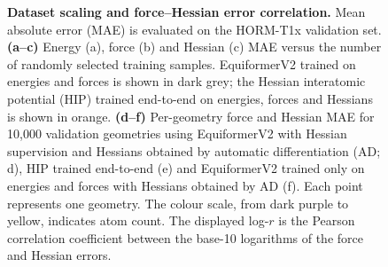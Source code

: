 \documentclass[pdflatex,sn-mathphys-num]{sn-jnl}%
\begin{document}
\begin{figure}[htbp]
     \caption{
     \textbf{Dataset scaling and force--Hessian error correlation.}
     Mean absolute error (MAE) is evaluated on the HORM-T1x validation set.
     \textbf{(a--c)} Energy (a), force (b) and Hessian (c) MAE versus the number of randomly selected training samples. EquiformerV2 trained on energies and forces is shown in dark grey; the Hessian interatomic potential (HIP) trained end-to-end on energies, forces and Hessians is shown in orange.
     \textbf{(d--f)} Per-geometry force and Hessian MAE for 10{,}000 validation geometries using EquiformerV2 with Hessian supervision and Hessians obtained by automatic differentiation (AD; d), HIP trained end-to-end (e) and EquiformerV2 trained only on energies and forces with Hessians obtained by AD (f). Each point represents one geometry. The colour scale, from dark purple to yellow, indicates atom count. The displayed log-$r$ is the Pearson correlation coefficient between the base-10 logarithms of the force and Hessian errors.
     }
     \label{fig:datascaling}
\end{figure}
\end{document}
